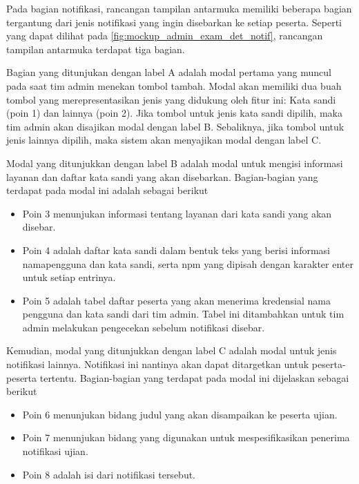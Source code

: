     Pada bagian notifikasi, rancangan tampilan antarmuka memiliki beberapa
    bagian tergantung dari jenis notifikasi yang ingin disebarkan ke setiap
    peserta. Seperti yang dapat dilihat pada
    \ref{fig:mockup_admin_exam_det_notif}, rancangan tampilan antarmuka terdapat
    tiga bagian.
    
    Bagian yang ditunjukan dengan label A adalah modal pertama yang muncul pada
    saat tim admin menekan tombol tambah. Modal akan memiliki dua buah tombol
    yang merepresentasikan jenis yang didukung oleh fitur ini: Kata sandi (poin
    1) dan lainnya (poin 2). Jika tombol untuk jenis kata sandi dipilih, maka
    tim admin akan disajikan modal dengan label B. Sebaliknya, jika tombol untuk
    jenis lainnya dipilih, maka sistem akan menyajikan modal dengan label C.
    
    Modal yang ditunjukkan dengan label B adalah modal untuk mengisi informasi
    layanan dan daftar kata sandi yang akan disebarkan. Bagian-bagian yang
    terdapat pada modal ini adalah sebagai berikut
    \begin{itemize}
        \item Poin 3 menunjukan informasi tentang layanan dari kata sandi yang
            akan disebar.
        
        \item Poin 4 adalah daftar kata sandi dalam bentuk teks yang berisi
            informasi namapengguna dan kata sandi, serta npm yang dipisah dengan
            karakter enter untuk setiap entrinya.
            
        \item Poin 5 adalah tabel daftar peserta yang akan menerima kredensial
            nama pengguna dan kata sandi dari tim admin. Tabel ini ditambahkan
            untuk tim admin melakukan pengecekan sebelum notifikasi disebar.
    \end{itemize}
    
    Kemudian, modal yang ditunjukkan dengan label C adalah modal untuk jenis
    notifikasi lainnya. Notifikasi ini nantinya akan dapat ditargetkan untuk
    peserta-peserta tertentu. Bagian-bagian yang terdapat pada modal ini
    dijelaskan sebagai berikut
    \begin{itemize}
        \item Poin 6 menunjukan bidang judul yang akan disampaikan ke peserta
        ujian.
        
        \item Poin 7 menunjukan bidang yang digunakan untuk mespesifikasikan
        penerima notifikasi ujian.
        
        \item Poin 8 adalah isi dari notifikasi tersebut.
    \end{itemize}
    
